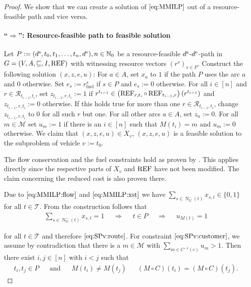 \begin{proof}

We show that we can create a solution of $\eqref{eq:MMILP}$ out of a resource-feasible path and vice versa.

\paragraph{\enquote{$\boldsymbol{\Rightarrow}$}: Resource-feasible path to feasible solution} \proofparfill

Let ${P:=\left(d^{\operatorname{s}},t_0,t_1,\dots,t_n,d^{\operatorname{e}}\right)}, {n\in\mathbb{N}_0}$ be a resource-feasible $d^{\operatorname{s}}$-$d^{\operatorname{e}}$-path in\linebreak
${G=\left(V,A,\sqsubseteq,I,\operatorname{REF}\right)}$ with witnessing resource vectors $\left(r^s\right)_{s\in P}$. Construct the following solution $(x,z,e,u)$: For $a\in A$, set $x_a$ to $1$ if the path $P$ uses the arc $a$ and $0$ otherwise. Set ${e_s := r^s_{\operatorname{fuel}}}$ if $s\in P$ and $e_s:=0$ otherwise. For all $i\in[n]$ and $r\in\mathcal{R}_{t_{i-1},t_i}$, set ${z_{t_{i-1},r,t_i} := 1}$ if ${r^{t_{i-1}}\in\left(\operatorname{REF}_{r,t_i}\circ\operatorname{REF}_{t_{i-1},r}\right)\left(r^{t_{i-1}}\right)}$ and ${z_{t_{i-1},r,t_i} := 0}$ otherwise. If this holds true for more than one ${r\in\mathcal{R}_{t_{i-1},t_i}}$, change $z_{t_{i-1},r,t_i}$ to $0$ for all such $r$ but one. For all other arcs $a\in A$, set $z_a:=0$. For all $m\in\mathcal{M}$ set ${u_m := 1}$ if there is an ${i\in[n]}$ such that ${M\left(t_i\right)=m}$ and ${u_m := 0}$ otherwise. We claim that $(x,z,e,u)\in X_v$, \ie $(x,z,e,u)$ is a feasible solution to the subproblem of vehicle $v:=t_0$.

The flow conservation and the fuel constraints hold as proven by \cite{Kaiser}. This applies directly since the respective parts of $X_v$ and $\operatorname{REF}$ have not been modified. The claim concerning the reduced cost is also proven there.

Due to $\eqref{eq:MMILP:flow}$ and $\eqref{eq:MMILP:xst}$ we have ${\sum_{s\in\operatorname{N}^-_{G}(t)} x_{s,t} \in\{0,1\}}$ for all $t\in\mathcal{T}$. From the construction follows that
\begin{align*}
	\sum_{s\in\operatorname{N}^-_{G}(t)} x_{s,t} = 1 && \Rightarrow && t\in P && \Rightarrow && u_{M(t)} = 1
\end{align*}

for all $t\in\mathcal{T}$ and therefore $\eqref{eq:SPv:route}$. For constraint $\eqref{eq:SPv:customer}$, we assume by contradiction that there is a $m\in\mathcal{M}$ with ${\sum_{m\in C^{-1}(c)} u_m > 1}$. Then there exist ${i,j\in[n]}$ with ${i<j}$ such that
\begin{align*}
	t_i,t_j\in P && \text{and} && M\left(t_i\right)\neq M\left(t_j\right) && (M\circ C)\left(t_i\right) = (M\circ C)\left(t_j\right).
\end{align*}


\end{proof}
